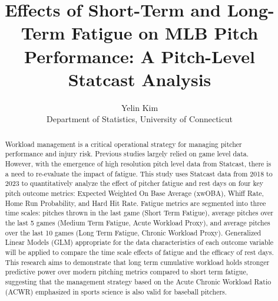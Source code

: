 \documentclass[12pt, letterpaper]{article}
\title{\bf Effects of Short-Term and Long-Term Fatigue on MLB Pitch Performance: A Pitch-Level Statcast Analysis}
\author{Yelin Kim\\[1ex]
Department of Statistics, University of Connecticut}
\begin{document}
\maketitle

\begin{abstract}
  Workload management is a critical operational strategy for managing pitcher performance and injury risk. Previous studies largely relied on game level data. However, with the emergence of high resolution pitch level data from Statcast, there is a need to re-evaluate the impact of fatigue. This study uses Statcast data from 2018 to 2023 to quantitatively analyze the effect of pitcher fatigue and rest days on four key pitch outcome metrics: Expected Weighted On Base Average (xwOBA), Whiff Rate, Home Run Probability, and Hard Hit Rate. Fatigue metrics are segmented into three time scales: pitches thrown in the last game (Short Term Fatigue), average pitches over the last 5 games (Medium Term Fatigue, Acute Workload Proxy), and average pitches over the last 10 games (Long Term Fatigue, Chronic Workload Proxy). Generalized Linear Models (GLM) appropriate for the data characteristics of each outcome variable will be applied to compare the time scale effects of fatigue and the efficacy of rest days. This research aims to demonstrate that long term cumulative workload holds stronger predictive power over modern pitching metrics compared to short term fatigue, suggesting that the management strategy based on the Acute Chronic Workload Ratio (ACWR) emphasized in sports science is also valid for baseball pitchers.
\end{abstract}

\doublespace
\end{document}
